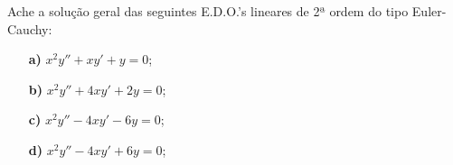 \linespread{1.5}
Ache a solução geral das seguintes E.D.O.'s lineares de 2ª ordem do tipo Euler-Cauchy:
\begin{itemize}
    \item[\textbf{a)}] $x^2y'' + xy' + y = 0$;
    \item[\textbf{b)}] $x^2y'' + 4xy' + 2y = 0$;
    \item[\textbf{c)}] $x^2y'' - 4xy' - 6y = 0$;
    \item[\textbf{d)}] $x^2y'' - 4xy' + 6y = 0$;
\end{itemize}